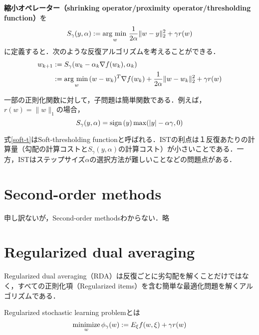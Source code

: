 \documentclass[a4paper,11pt]{jsarticle}
\numberwithin{theorem}{section}  %
\numberwithin{equation}{section} %
\newcommand{\argmin}{\mathop{\rm arg~min\,}\limits}
\newcommand{\sign}{\mathop{\rm sign\,}\limits}
\newcommand{\minimize}{\mathop{\mathrm{\rm minimize}}\limits}
\begin{document}
{\bf 縮小オペレーター（shrinking operator/proximity operator/thresholding function）}を
\begin{equation}
S_\gamma(y,\alpha) := \argmin_{w} \frac{1}{2\alpha}\| w - y \|_2^2 + \gamma r(w)
\end{equation}
に定義すると．次のような反復アルゴリズムを考えることができる．
\begin{equation}
\begin{split}
w_{k+1} & := S_\gamma(w_k - \alpha_k \nabla f(w_k),\alpha_k)\\
& := \argmin_{w} (w - w_k)^T \nabla f(w_k) + \frac{1}{2\alpha}\| w - w_k \|_2^2 + \gamma r(w) 
\end{split}
\end{equation}

一部の正則化関数に対して，子問題は簡単関数である．例えば，$r(w)=\|w\|_1$の場合，
\begin{equation}
S_\gamma(y,\alpha) = \sign(y)\max(|y|-\alpha \gamma,0) \label{soft-t}
\end{equation}

式\ref{soft-t}はSoft-thresholding functionと呼ばれる．ISTの利点は１反復あたりの計算量（勾配の計算コストと$S_\gamma(y,\alpha)$の計算コスト）が小さいことである．一方，ISTはステップサイズ$\alpha$の選択方法が難しいことなどの問題点がある．

\section{Second-order methods}
申し訳ないが，Second-order methodsわからない．略

\section{Regularized dual averaging}
Regularized dual averaging（RDA）は反復ごとに劣勾配を解くことだけではなく，すべての正則化項（Regularized items）を含む簡単な最適化問題を解くアルゴリズムである．

Regularized stochastic learning problemとは
\begin{equation}
\minimize_{w} \phi_\gamma(w) := E_\xi f(w,\xi) + \gamma r(w)
\end{equation}
\end{document}
